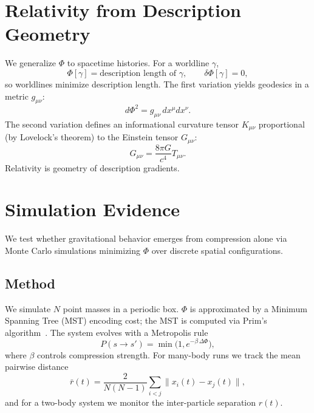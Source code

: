 \documentclass[aps,preprint,onecolumn,longbibliography,nofootinbib]{revtex4-2}
\numberwithin{equation}{section}        %
\begin{document}
\section{Relativity from Description Geometry}
We generalize $\Phi$ to spacetime histories. For a worldline $\gamma$,
\begin{equation}
\Phi[\gamma] = \text{description length of }\gamma,\qquad \delta \Phi[\gamma]=0, \label{eq:worldline}
\end{equation}
so worldlines minimize description length. The first variation yields geodesics in a metric $g_{\mu\nu}$:
\begin{equation}
d\Phi^2 = g_{\mu\nu}\,dx^\mu dx^\nu. \label{eq:metric}
\end{equation}
The second variation defines an informational curvature tensor $K_{\mu\nu}$ proportional (by Lovelock's theorem) to the Einstein tensor $G_{\mu\nu}$:
\begin{equation}
G_{\mu\nu} = \frac{8\pi G}{c^4} T_{\mu\nu}. \label{eq:einstein}
\end{equation}
Relativity is geometry of description gradients.

\section{Simulation Evidence}
We test whether gravitational behavior emerges from compression alone via Monte Carlo simulations minimizing $\Phi$ over discrete spatial configurations.

\subsection{Method}
We simulate $N$ point masses in a periodic box. $\Phi$ is approximated by a Minimum Spanning Tree (MST) encoding cost; the MST is computed via Prim's algorithm~\cite{Prim1957}. The system evolves with a Metropolis rule
\begin{equation}
P(s\to s') = \min\!\bigl(1, e^{-\beta\,\Delta \Phi}\bigr), \label{eq:metro}
\end{equation}
where $\beta$ controls compression strength. For many-body runs we track the mean pairwise distance
\begin{equation}
\bar r(t) = \frac{2}{N(N-1)}\sum_{i<j}\|x_i(t)-x_j(t)\|, \label{eq:meanpair}
\end{equation}
and for a two-body system we monitor the inter-particle separation $r(t)$.
\end{document}
